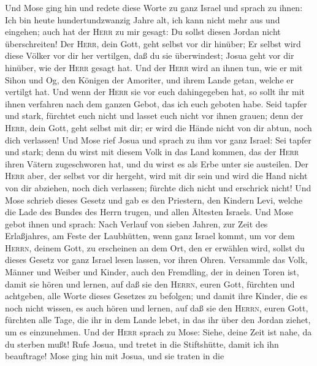 Und Mose ging hin und redete diese Worte zu ganz Israel
und sprach zu ihnen:  Ich bin heute hundertundzwanzig
Jahre alt, ich kann nicht mehr aus und eingehen; auch hat der
\textsc{Herr} zu mir gesagt: Du sollst diesen Jordan nicht
überschreiten!  Der \textsc{Herr}, dein Gott, geht selbst
vor dir hinüber; Er selbst wird diese Völker vor dir her vertilgen, daß
du sie überwindest; Josua geht vor dir hinüber, wie der \textsc{Herr}
gesagt hat.  Und der \textsc{Herr} wird an ihnen tun, wie
er mit Sihon und Og, den Königen der Amoriter, und ihrem Lande getan,
welche er vertilgt hat.  Und wenn der \textsc{Herr} sie
vor euch dahingegeben hat, so sollt ihr mit ihnen verfahren nach dem
ganzen Gebot, das ich euch geboten habe.  Seid tapfer und
stark, fürchtet euch nicht und lasset euch nicht vor ihnen grauen; denn
der \textsc{Herr}, dein Gott, geht selbst mit dir; er wird die Hände
nicht von dir abtun, noch dich verlassen!  Und Mose rief
Josua und sprach zu ihm vor ganz Israel: Sei tapfer und stark; denn du
wirst mit diesem Volk in das Land kommen, das der \textsc{Herr} ihren
Vätern zugeschworen hat, und du wirst es als Erbe unter sie austeilen.
 Der \textsc{Herr} aber, der selbst vor dir hergeht, wird
mit dir sein und wird die Hand nicht von dir abziehen, noch dich
verlassen; fürchte dich nicht und erschrick nicht!  Und
Mose schrieb dieses Gesetz und gab es den Priestern, den Kindern Levi,
welche die Lade des Bundes des Herrn trugen, und allen Ältesten Israels.
 Und Mose gebot ihnen und sprach: Nach Verlauf von sieben
Jahren, zur Zeit des Erlaßjahres, am Feste der Laubhütten,
 wenn ganz Israel kommt, um vor dem \textsc{Herrn},
deinem Gott, zu erscheinen an dem Ort, den er erwählen wird, sollst du
dieses Gesetz vor ganz Israel lesen lassen, vor ihren Ohren.
 Versammle das Volk, Männer und Weiber und Kinder, auch
den Fremdling, der in deinen Toren ist, damit sie hören und lernen, auf
daß sie den \textsc{Herrn}, euren Gott, fürchten und achtgeben, alle
Worte dieses Gesetzes zu befolgen;  und damit ihre
Kinder, die es noch nicht wissen, es auch hören und lernen, auf daß sie
den \textsc{Herrn}, euren Gott, fürchten alle Tage, die ihr in dem Lande
lebet, in das ihr über den Jordan ziehet, um es einzunehmen.
 Und der \textsc{Herr} sprach zu Mose: Siehe, deine Zeit
ist nahe, da du sterben mußt! Rufe Josua, und tretet in die Stiftshütte,
damit ich ihn beauftrage! Mose ging hin mit Josua, und sie traten in die
